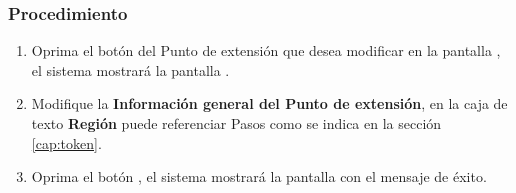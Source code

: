 \subsubsection{Procedimiento}
\begin{enumerate}
	\item Oprima el botón \btnEditar del Punto de extensión que desea modificar en la pantalla , el sistema mostrará la pantalla . 

	
	\item Modifique la \textbf{Información general del Punto de extensión}, en la caja de texto \textbf{Región} puede referenciar Pasos como se indica en la sección \ref{cap:token}.
	
	\item Oprima el botón , el sistema mostrará la pantalla  con el mensaje de éxito.
\end{enumerate}
